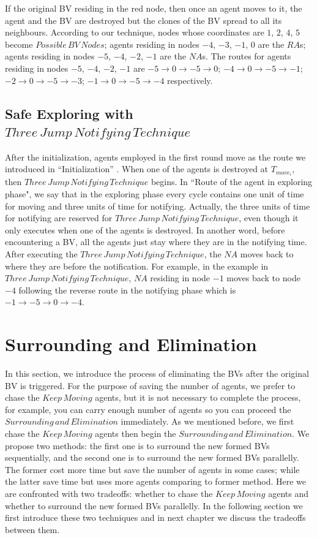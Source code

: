 \documentclass[conference]{IEEEtran}
\begin{document}
If the original BV residing in the red node, then once an agent moves to it, the agent and the BV are destroyed but the clones of the BV spread to all its neighbours. According to our technique, nodes whose coordinates are $1$, $2$, $4$, $5$ become $Possible\,BV\,Nodes$; agents residing in nodes $-4$, $-3$, $-1$, $0$ are the $RA$s; agents residing in nodes $-5$, $-4$, $-2$, $-1$ are the $NA$s. The routes for agents residing in nodes $-5$, $-4$, $-2$, $-1$ are $-5{\rightarrow}0{\rightarrow}-5{\rightarrow}0$; $-4{\rightarrow}0{\rightarrow}-5{\rightarrow}-1$; $-2{\rightarrow}0{\rightarrow}-5{\rightarrow}-3$; $-1{\rightarrow}0{\rightarrow}-5{\rightarrow}-4$ respectively.\\

\subsection{Safe Exploring with $Three\,Jump\,Notifying\,Technique$}

After the initialization, agents employed in the first round move as the route we introduced in ``Initialization'' . When one of the agents is destroyed at $T_{move_i}$, then $Three\,Jump\,Notifying\,Technique$ begins. In ``Route of the agent in exploring phase", we say that in the exploring phase every cycle contains one unit of time for moving and three units of time for notifying. Actually, the three units of time for notifying are reserved for $Three\,Jump\,Notifying\,Technique$, even though it only executes when one of the agents is destroyed. In another word, before encountering a BV, all the agents just stay where they are in the notifying time.
After executing the $Three\,Jump\,Notifying\,Technique$, the $NA$ moves back to where they are before the notification. For example, in the example in $Three\,Jump\,Notifying\,Technique$, $NA$ residing in node $-1$ moves back to node $-4$ following the reverse route in the notifying phase which is $-1{\rightarrow}-5{\rightarrow}0{\rightarrow}-4$. 

\section{Surrounding and Elimination}
In this section, we introduce the process of eliminating the BVs after the original BV is triggered. For the purpose of saving the number of agents, we prefer to chase the $Keep\,Moving$ agents, but it is not necessary to complete the process, for example, you can carry enough number of agents so you can proceed the $Surrounding\,and\,Elimination$ immediately. As we mentioned before, we first chase the $Keep\,Moving$ agents then begin the $Surrounding\,and\,Elimination$. We propose two methods: the first one is to surround the new formed BVs sequentially, and the second one is to surround the new formed BVs parallelly. The former cost more time but save the number of agents in some cases; while the latter save time but uses more agents comparing to former method. Here we are confronted with two tradeoffs: whether to chase the $Keep\,Moving$ agents and whether to surround the new formed BVs parallelly. In the following section we first introduce these two techniques and in next chapter we discuss the tradeoffs between them.
\end{document}
